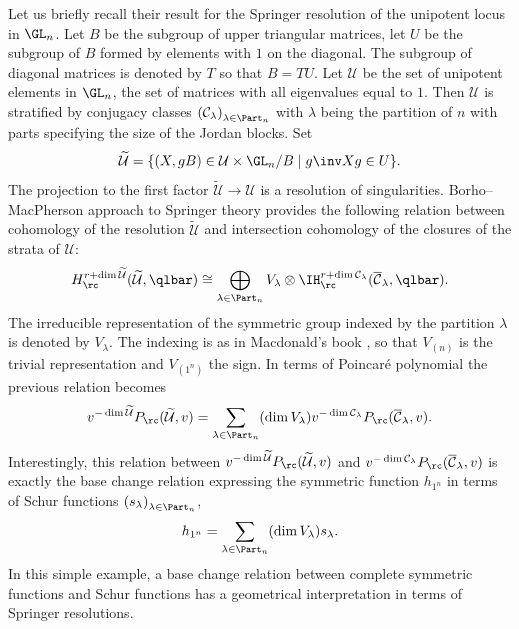 Let us briefly recall their result for the Springer resolution of the unipotent locus in $\GL_n$. Let $B$ be the subgroup of upper triangular matrices, let $U$ be the subgroup of $B$ formed by elements with $1$ on the diagonal. The subgroup of diagonal matrices is denoted by $T$ so that $B=T U$. Let $\mathcal{U}$ be the set of unipotent elements in $\GL_n$, \ie the set of matrices with all eigenvalues equal to $1$. Then $\mathcal{U}$ is stratified by conjugacy classes $\left(\mathcal{C}_{\lambda}\right)_{\lambda\in\Part_n}$ with $\lambda$ being the partition of $n$ with parts specifying the size of the Jordan blocks. Set
\[
\widetilde{\mathcal{U}}=\lbrace (X, g B)\in\mathcal{U}\times \GL_n/B \mid g\inv X g \in U \rbrace.
\]
The projection to the first factor $\widetilde{\mathcal{U}}\to\mathcal{U}$ is a resolution of singularities. Borho--MacPherson approach to Springer theory provides the following relation between cohomology of the resolution $\widetilde{\mathcal{U}}$ and intersection cohomology of the closures of the strata of $\mathcal{U}$:
\[
H_\rc^{r+\dim \widetilde{\mathcal{U}}}(\widetilde{\mathcal{U}}, \qlbar) \cong \bigoplus_{\lambda \in \Part_n} V_{\lambda} \otimes \IH_{\rc}^{r+\dim \mathcal{C}_{\lambda}}(\overline{\mathcal{C}}_{\lambda},\qlbar).
\]
The irreducible representation of the symmetric group indexed by the partition $\lambda$ is denoted by $V_{\lambda}$. The indexing is as in Macdonald's book \cite{Macdonald}, so that $V_{(n)}$ is the trivial representation and $V_{(1^n)}$ the sign. In terms of Poincaré polynomial the previous relation becomes
\[
v^{-\dim \widetilde{\mathcal{U}}} P_{\rc}(\widetilde{\mathcal{U}},v) = \sum_{\lambda\in \Part_n}(\dim V_{\lambda}) v^{-\dim \mathcal{C}_{\lambda}} P_{\rc}(\overline{\mathcal{C}}_{\lambda},v).
\]
Interestingly, this relation between $v^{-\dim \widetilde{\mathcal{U}}} P_{\rc}(\widetilde{\mathcal{U}},v)$ and $v^{-\dim \mathcal{C}_{\lambda}}P_{\rc}(\overline{\mathcal{C}}_{\lambda},v)$ is exactly the base change relation expressing the symmetric function $h_{1^n}$ in terms of Schur functions $\left(s_{\lambda}\right)_{\lambda\in\Part_n}$,
\[
h_{1^n} = \sum_{\lambda\in\Part_n} (\dim V_{\lambda}) s_{\lambda}.
\]
In this simple example, a base change relation between complete symmetric functions and Schur functions has a geometrical interpretation in terms of Springer resolutions.

